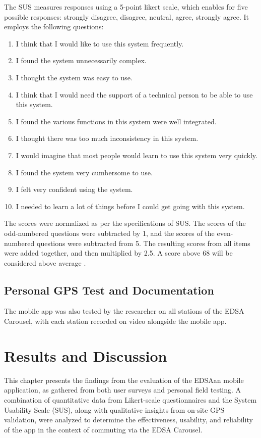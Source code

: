 \documentclass[journal]{./IEEE/IEEEtran}
\begin{document}
The SUS measures responses using a 5-point likert scale, which enables for five possible responses: strongly disagree, disagree, neutral, agree, strongly agree. It employs the following questions:
\begin{enumerate}
    \item I think that I would like to use this system frequently.
    \item I found the system unnecessarily complex.
    \item I thought the system was easy to use.
    \item I think that I would need the support of a technical person to be able to use this system.
    \item I found the various functions in this system were well integrated.
    \item I thought there was too much inconsistency in this system.
    \item I would imagine that most people would learn to use this system very quickly.
    \item I found the system very cumbersome to use.
    \item I felt very confident using the system.
    \item I needed to learn a lot of things before I could get going with this system.

\end{enumerate}
The scores were normalized as per the specifications of SUS. The scores of the odd-numbered questions were subtracted by 1, and the scores of the even-numbered questions were subtracted from 5. The resulting scores from all items were added together, and then multiplied by 2.5. A score above 68 will be considered above average \cite{Ref:019}.

\subsection{Personal GPS Test and Documentation}
The mobile app was also tested by the researcher on all stations of the EDSA Carousel, with each station recorded on video alongside the mobile app.


\section{Results and Discussion}

This chapter presents the findings from the evaluation of the EDSAan mobile application, as gathered from both user surveys and personal field testing. A combination of quantitative data from Likert-scale questionnaires and the System Usability Scale (SUS), along with qualitative insights from on-site GPS validation, were analyzed to determine the effectiveness, usability, and reliability of the app in the context of commuting via the EDSA Carousel.
\end{document}
